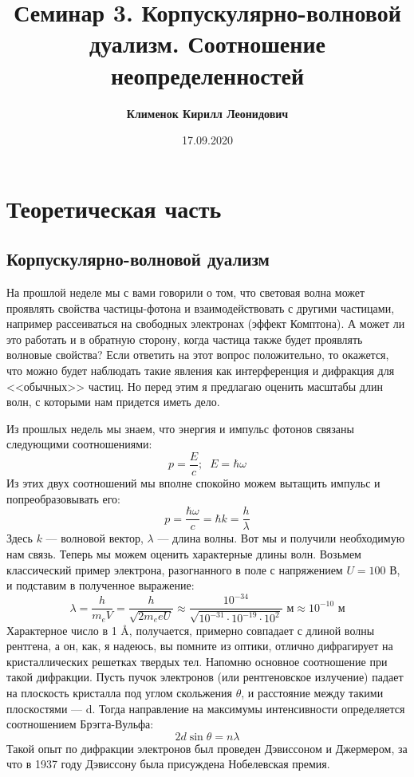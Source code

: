 \documentclass[12pt]{article}
\begin{document}
 

\title{\textbf{Семинар 3. Корпускулярно-волновой дуализм. Соотношение неопределенностей}}
\author{\textbf{Клименок Кирилл Леонидович}}
\date{17.09.2020}
\maketitle

\section{Теоретическая часть}

\subsection{Корпускулярно-волновой дуализм}
На прошлой неделе мы с вами говорили о том, что световая волна может проявлять свойства частицы-фотона и взаимодействовать с другими частицами, например рассеиваться на свободных электронах (эффект Комптона). А может ли это работать и в обратную сторону, когда частица также будет проявлять волновые свойства? Если ответить на этот вопрос положительно, то окажется, что можно будет наблюдать такие явления как интерференция и дифракция для <<обычных>> частиц. Но перед этим я предлагаю оценить масштабы длин волн, с которыми нам придется иметь дело. 

Из прошлых недель мы знаем, что энергия и импульс фотонов связаны следующими соотношениями:
\begin{equation*}
    p = \dfrac{E}{c}; \;\; E = \hbar \omega
\end{equation*}
Из этих двух соотношений мы вполне спокойно можем вытащить импульс и попреобразовывать его:
\begin{equation}
    p = \dfrac{\hbar \omega}{c} = \hbar k = \dfrac{h}{\lambda}
\end{equation}
Здесь $k$ --- волновой вектор, $\lambda$ --- длина волны. Вот мы и получили необходимую нам связь. Теперь мы можем оценить характерные длины волн. Возьмем классический пример электрона, разогнанного в поле с напряжением $U=100$ В, и подставим в полученное выражение:
\begin{equation*}
    \lambda = \dfrac{h}{m_eV} = \dfrac{h}{\sqrt{2m_eeU}} \approx \dfrac{10^{-34}}{\sqrt{10^{-31}\cdot10^{-19}\cdot10^{2}}} \text{ м} \approx 10^{-10} \text{ м}
\end{equation*}
Характерное число в 1 \AA, получается, примерно совпадает с длиной волны рентгена, а он, как, я надеюсь, вы помните из оптики, отлично дифрагирует на кристаллических решетках твердых тел. Напомню основное соотношение при такой дифракции. Пусть пучок электронов (или рентгеновское излучение) падает на плоскость кристалла под углом скольжения $\theta$, и расстояние между такими плоскостями --- d. Тогда направление на максимумы интенсивности определяется соотношением Брэгга-Вульфа: 
\begin{equation*}
    2d\sin{\theta} = n\lambda
\end{equation*}
Такой опыт по дифракции электронов был проведен Дэвиссоном и Джермером, за что в 1937 году Дэвиссону была присуждена Нобелевская премия.
\end{document}
